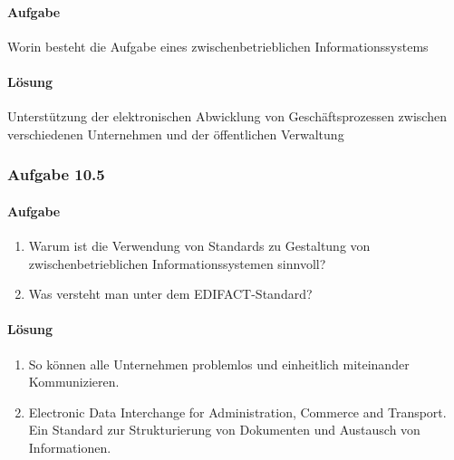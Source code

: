     \paragraph*{Aufgabe}
        Worin besteht die Aufgabe eines zwischenbetrieblichen Informationssystems
    \paragraph*{Lösung}
        Unterstützung der elektronischen Abwicklung von Geschäftsprozessen zwischen verschiedenen Unternehmen und der öffentlichen Verwaltung

\subsubsection*{Aufgabe 10.5}
    \paragraph*{Aufgabe}
        \begin{enumerate}[label=\alph*)]
            \item Warum ist die Verwendung von Standards zu Gestaltung von zwischenbetrieblichen Informationssystemen sinnvoll?
            \item Was versteht man unter dem EDIFACT-Standard?
        \end{enumerate}
    \paragraph*{Lösung}
        \begin{enumerate}[label=\alph*)]
            \item So können alle Unternehmen problemlos und einheitlich miteinander Kommunizieren.
            \item Electronic Data Interchange for Administration, Commerce and Transport.
            Ein Standard zur Strukturierung von Dokumenten und Austausch von Informationen.      
        \end{enumerate}
